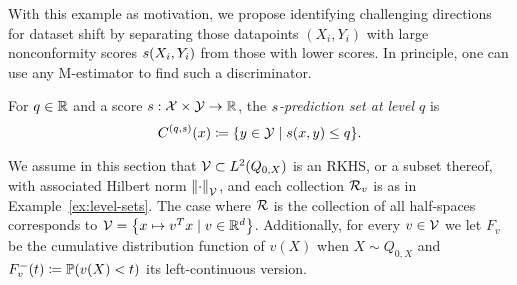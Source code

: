 With this example as motivation, we propose identifying challenging
directions for dataset shift by separating those datapoints $(X_i, Y_i)$
with large nonconformity scores $s(X_i, Y_i)$ from those with lower
scores.  In principle, one can use any M-estimator to find such a
discriminator. 
\begin{definition}%
  \label{def:smallest-rho-s}
  For $q \in \mathbb{R}$ and a score  $s : \mathcal{X} \times
  \mathcal{Y} \to \mathbb{R}$, the \emph{$s$-prediction set at level $q$} is
  \begin{equation}
    \label{eqn:confidence-set-from-score}
    C^{(q,s)}(x) \coloneqq \{ y \in \mathcal{Y} \mid s(x,y) \le q \}.
  \end{equation}
\end{definition}

We assume in this section that $\mathcal{V} \subset L^2(Q_{0,X})$ is an RKHS, or a
subset thereof, with associated Hilbert norm $\left\|{\cdot}\right\|_{\mathcal{V}}$, and
each collection $\mathcal{R}_v$ is as in Example~\ref{ex:level-sets}.  The case
where $\mathcal{R}$ is the collection of all half-spaces corresponds to $\mathcal{V} =
\left\{ x \mapsto v^T x \mid v\in \mathbb{R}^d \right\}$.  Additionally, for every
$v \in \mathcal{V}$ we let $F_v$ be the cumulative distribution function of
$v(X)$ when $X \sim Q_{0,X}$ and $F_v^-(t) \coloneqq \mathbb{P}(v(X) < t)$
its left-continuous version.

